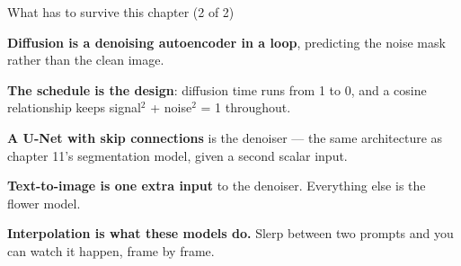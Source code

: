 \documentclass[aspectratio=169,11pt,t]{beamer}
\begin{document}
\begin{frame}[shrink=25]{What has to survive this chapter (2 of 2)}
\begin{isteps}
\item \textbf{Diffusion is a denoising autoencoder in a loop}, predicting the noise mask rather than the clean image.
\item \textbf{The schedule is the design}: diffusion time runs from 1 to 0, and a cosine relationship keeps signal$^{2}$ + noise$^{2}$ = 1 throughout.
\item \textbf{A U-Net with skip connections} is the denoiser --- the same architecture as chapter 11's segmentation model, given a second scalar input.
\item \textbf{Text-to-image is one extra input} to the denoiser. Everything else is the flower model.
\item \textbf{Interpolation is what these models do.} Slerp between two prompts and you can watch it happen, frame by frame.
\end{isteps}
\vskip 4pt
\vskip 2pt
\end{frame}
\end{document}
